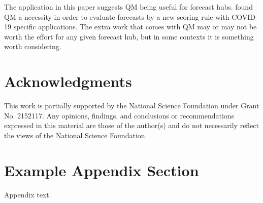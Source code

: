 \documentclass[preprint,12pt,authoryear]{elsarticle}
\newcommand{\1}[1]{\mathds{1}\left[#1\right]}
\begin{document}
The application in this paper suggests QM being useful for forecast hubs.  
\cite{gerding2023evaluating} found QM a necessity in order to evaluate 
forecasts by a new scoring rule with COVID-19 specific applications. The extra 
work that comes with QM may or may not be worth the effort for any given 
forecast hub, but in some contexts it is something worth considering.


\section{Acknowledgments}
This work is partially supported by the National Science Foundation under 
Grant No. 2152117. Any opinions, findings, and conclusions or recommendations 
expressed in this material are those of the author(s) and do not necessarily 
reflect the views of the National Science Foundation.

\appendix
\section{Example Appendix Section}
\label{app1}

Appendix text.







% 
% 
% 
\end{document}
